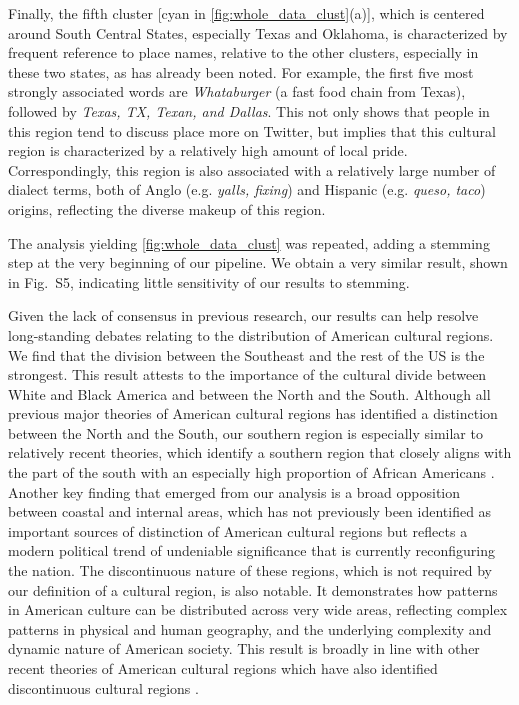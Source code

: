 \documentclass[../thesis.tex]{subfiles}
\begin{document}
Finally, the fifth cluster [cyan in \cref{fig:whole_data_clust}(a)], which is centered
around South Central States, especially Texas and Oklahoma, is characterized by frequent
reference to place names, relative to the other clusters, especially in these two
states, as has already been noted. For example, the first five most strongly associated
words are \textit{Whataburger} (a fast food chain from Texas), followed by
\textit{Texas, TX, Texan, and Dallas}. This not only shows that people in this region
tend to discuss place more on Twitter, but implies that this cultural region is
characterized by a relatively high amount of local pride. Correspondingly, this region
is also associated with a relatively large number of dialect terms, both of Anglo (e.g.
\textit{yalls, fixing}) and Hispanic (e.g. \textit{queso, taco}) origins, reflecting the
diverse makeup of this region.

The analysis yielding \cref{fig:whole_data_clust} was repeated, adding a stemming step
at the very beginning of our pipeline. We obtain a very similar result, shown in
Fig.~S5, indicating little sensitivity of our results to stemming.

Given the lack of consensus in previous research, our results can help resolve
long-standing debates relating to the distribution of American cultural regions. We find
that the division between the Southeast and the rest of the US is the strongest. This
result attests to the importance of the cultural divide between White and Black America
and between the North and the South. Although all previous major theories of American
cultural regions has identified a distinction between the North and the South, our
southern region is especially similar to relatively recent theories, which identify a
southern region that closely aligns with the part of the south with an especially high
proportion of African Americans
\cite{LieskeRegionalSubcultures1993,WoodardAmericanNations2012}. Another key finding
that emerged from our analysis is a broad opposition between coastal and internal areas,
which has not previously been identified as important sources of distinction of American
cultural regions
\cite{OdumSouthernRegions1936,ElazarCitiesPrairie1970,ZelinskyCulturalGeography1992,GastilCulturalRegions1975,GarreauNineNations1996,FischerAlbionSeed1989,LieskeRegionalSubcultures1993,WoodardAmericanNations2012}
but reflects a modern political trend of undeniable significance
\cite{GelmanRedState2009} that is currently reconfiguring the nation. The discontinuous
nature of these regions, which is not required by our definition of a cultural region,
is also notable. It demonstrates how patterns in American culture can be distributed
across very wide areas, reflecting complex patterns in physical and human geography, and
the underlying complexity and dynamic nature of American society. This result is broadly
in line with other recent theories of American cultural regions which have also
identified discontinuous cultural regions
\cite{LieskeRegionalSubcultures1993,WoodardAmericanNations2012}.
\end{document}
